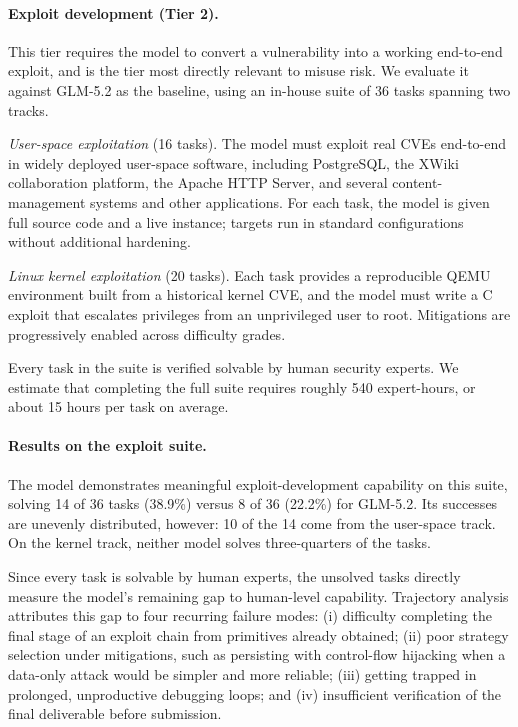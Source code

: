 \paragraph{Exploit development (Tier 2).}
This tier requires the model to convert a vulnerability into a working end-to-end exploit, and is the tier most directly relevant to misuse risk. We evaluate it against GLM-5.2 as the baseline, using an in-house suite of 36 tasks spanning two tracks.

\emph{User-space exploitation} (16 tasks). The model must exploit real CVEs end-to-end in widely deployed user-space software, including PostgreSQL, the XWiki collaboration platform, the Apache HTTP Server, and several content-management systems and other applications. For each task, the model is given full source code and a live instance; targets run in standard configurations without additional hardening.

\emph{Linux kernel exploitation} (20 tasks). Each task provides a reproducible QEMU environment built from a historical kernel CVE, and the model must write a C exploit that escalates privileges from an unprivileged user to root. Mitigations are progressively enabled across difficulty grades.

Every task in the suite is verified solvable by human security experts. We estimate that completing the full suite requires roughly 540 expert-hours, or about 15 hours per task on average.

\paragraph{Results on the exploit suite.}
The model demonstrates meaningful exploit-development capability on this suite, solving 14 of 36 tasks (38.9\%) versus 8 of 36 (22.2\%) for GLM-5.2. Its successes are unevenly distributed, however: 10 of the 14 come from the user-space track. On the kernel track, neither model solves three-quarters of the tasks.

Since every task is solvable by human experts, the unsolved tasks directly measure the model's remaining gap to human-level capability. Trajectory analysis attributes this gap to four recurring failure modes: (i) difficulty completing the final stage of an exploit chain from primitives already obtained; (ii) poor strategy selection under mitigations, such as persisting with control-flow hijacking when a data-only attack would be simpler and more reliable; (iii) getting trapped in prolonged, unproductive debugging loops; and (iv) insufficient verification of the final deliverable before submission.

